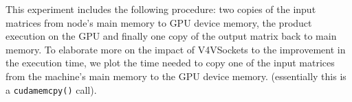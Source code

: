 \documentclass[a0paper,portrait,final]{baposter}
\begin{document}
\begin{poster}
{\begin{multicols}{3}
This experiment includes the following procedure: two copies of the input
matrices from node's main memory to GPU device memory, the product execution on
the GPU and finally one copy of the output matrix back to main memory. %
To elaborate more on the impact of V4VSockets to the improvement in the
execution time, we plot the time needed to copy one of the input
matrices from the machine's main memory to the GPU device memory. (essentially
this is a \texttt{cudamemcpy()} call).
\end{multicols}


\vspace{1em}
}

\end{poster}
\end{document}
